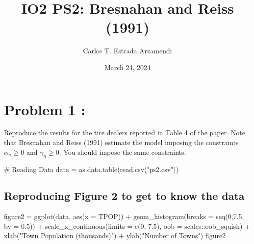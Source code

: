 \documentclass[
  letterpaper,
  DIV=11,
  numbers=noendperiod]{scrartcl}
\title{IO2 PS2: Bresnahan and Reiss (1991)}
\author{Carlos T. Estrada Arzamendi}
\date{March 24, 2024}
\newenvironment{Shaded}{\begin{snugshade}}{\end{snugshade}}
\newcommand{\AttributeTok}[1]{\textcolor[rgb]{0.40,0.45,0.13}{#1}}
\newcommand{\CommentTok}[1]{\textcolor[rgb]{0.37,0.37,0.37}{#1}}
\newcommand{\DecValTok}[1]{\textcolor[rgb]{0.68,0.00,0.00}{#1}}
\newcommand{\FloatTok}[1]{\textcolor[rgb]{0.68,0.00,0.00}{#1}}
\newcommand{\FunctionTok}[1]{\textcolor[rgb]{0.28,0.35,0.67}{#1}}
\newcommand{\NormalTok}[1]{\textcolor[rgb]{0.00,0.23,0.31}{#1}}
\newcommand{\OtherTok}[1]{\textcolor[rgb]{0.00,0.23,0.31}{#1}}
\newcommand{\SpecialCharTok}[1]{\textcolor[rgb]{0.37,0.37,0.37}{#1}}
\newcommand{\StringTok}[1]{\textcolor[rgb]{0.13,0.47,0.30}{#1}}
\begin{document}
\maketitle

\section{Problem 1 :}\label{problem-1}

Reproduce the results for the tire dealers reported in Table 4 of the
paper. Note that Bresnahan and Reiss (1991) estimate the model imposing
the constraints \(\alpha_n \geq 0\) and \(\gamma_n \geq 0\). You should
impose the same constraints.

\begin{Shaded}
\begin{Highlighting}[]
\CommentTok{\# Reading Data}
\NormalTok{data }\OtherTok{=} \FunctionTok{as.data.table}\NormalTok{(}\FunctionTok{read.csv}\NormalTok{(}\StringTok{"ps2.csv"}\NormalTok{))}
\end{Highlighting}
\end{Shaded}

\subsection{Reproducing Figure 2 to get to know the
data}\label{reproducing-figure-2-to-get-to-know-the-data}

\begin{Shaded}
\begin{Highlighting}[]
\NormalTok{figure2 }\OtherTok{=} \FunctionTok{ggplot}\NormalTok{(data, }\FunctionTok{aes}\NormalTok{(}\AttributeTok{x =}\NormalTok{ TPOP)) }\SpecialCharTok{+} 
                \FunctionTok{geom\_histogram}\NormalTok{(}\AttributeTok{breaks =} \FunctionTok{seq}\NormalTok{(}\DecValTok{0}\NormalTok{,}\FloatTok{7.5}\NormalTok{, }\AttributeTok{by =} \FloatTok{0.5}\NormalTok{)) }\SpecialCharTok{+} 
                \FunctionTok{scale\_x\_continuous}\NormalTok{(}\AttributeTok{limits =} \FunctionTok{c}\NormalTok{(}\DecValTok{0}\NormalTok{, }\FloatTok{7.5}\NormalTok{), }\AttributeTok{oob =}\NormalTok{ scales}\SpecialCharTok{::}\NormalTok{oob\_squish) }\SpecialCharTok{+}
                \FunctionTok{xlab}\NormalTok{(}\StringTok{"Town Population (thousands)"}\NormalTok{) }\SpecialCharTok{+}
                \FunctionTok{ylab}\NormalTok{(}\StringTok{"Number of Towns"}\NormalTok{)}
\NormalTok{figure2}
\end{Highlighting}
\end{Shaded}
\end{document}
